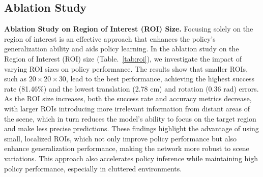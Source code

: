 \begin{table}[htbp]
\centering
{}
\caption{ Ablation study on Region of Interest (ROI) size shows that the smallest ROI ($20 \times 20 \times 30$ cm) achieves the best results, with the highest success rate and lowest errors. Larger ROIs decrease performance due to irrelevant information from distant areas, highlighting the benefit of smaller, localized ROIs for improved accuracy and efficiency.}
\label{tab:roi}

\end{table}


\subsection{Ablation Study} 

\textbf{Ablation Study on Region of Interest (ROI) Size.} Focusing solely on the region of interest is an effective approach that enhances the policy’s generalization ability and aids policy learning. In the ablation study on the Region of Interest (ROI) size (Table.~\ref{tab:roi}), we investigate the impact of varying ROI sizes on policy performance. The results show that smaller ROIs, such as $20 \times 20 \times 30$, lead to the best performance, achieving the highest success rate (81.46\%) and the lowest translation (2.78 cm) and rotation (0.36 rad) errors. As the ROI size increases, both the success rate and accuracy metrics decrease, with larger ROIs introducing more irrelevant information from distant areas of the scene, which in turn reduces the model's ability to focus on the target region and make less precise predictions. These findings highlight the advantage of using small, localized ROIs, which not only improve policy performance but also enhance generalization performance, making the network more robust to scene variations. This approach also accelerates policy inference while maintaining high policy performance, especially in cluttered environments.


